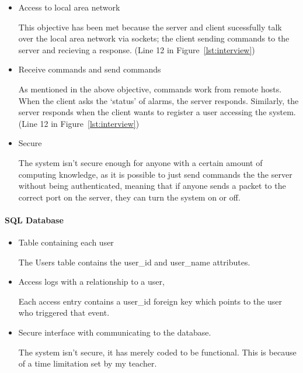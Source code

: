 \documentclass[12pt,a4paper]{report}
\newcounter{Figure}
\begin{document}
			\begin{itemize}
				\item Access to local area network
                    
                    This objective has been met because the server and client sucessfully talk over the local area network
                    via sockets; the client sending commands to the server and recieving a response. (Line 12 in Figure~\ref{lst:interview})

				\item Receive commands and send commands
                    
                    As mentioned in the above objective, commands work from remote hosts. When the client asks the `status' of
                    alarms, the server responds. Similarly, the server responds when the client wants to register a user 
                    accessing the system. (Line 12 in Figure~\ref{lst:interview})

				\item Secure
                    
                    The system isn't secure enough for anyone with a certain amount of computing knowledge, as it is possible to
                    just send commands the the server without being authenticated, meaning that if anyone sends a packet to the
                    correct port on the server, they can turn the system on or off.

			\end{itemize}

		\paragraph{SQL Database}
		
			\begin{itemize}
				\item Table containing each user

					The Users table contains the user\_id and user\_name attributes.

				\item Access logs with a relationship to a user,

					Each access entry contains a user\_id foreign key which points to the user who triggered that event.

				\item Secure interface with communicating to the database.

					The system isn't secure, it has merely coded to be functional. This is because of a time limitation set by my teacher.

			\end{itemize}
\end{document}

